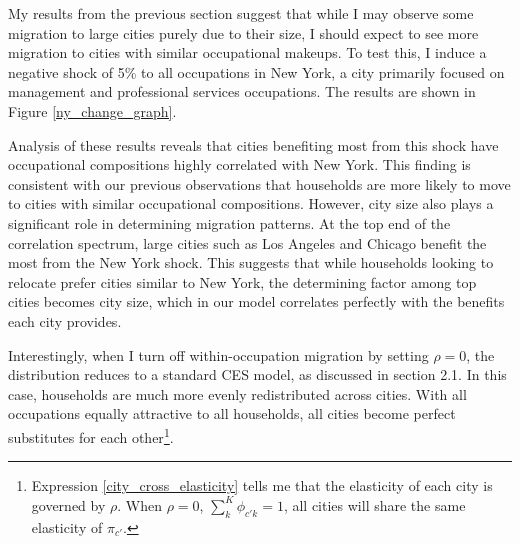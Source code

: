 \documentclass[10pt]{article}
\begin{document}
My results from the previous section suggest that while I may observe some migration to large cities purely due to their size, I should expect to see more migration to cities with similar occupational makeups. To test this, I induce a negative shock of 5\% to all occupations in New York, a city primarily focused on management and professional services occupations. The results are shown in Figure \ref{ny_change_graph}.

Analysis of these results reveals that cities benefiting most from this shock have occupational compositions highly correlated with New York. This finding is consistent with our previous observations that households are more likely to move to cities with similar occupational compositions. However, city size also plays a significant role in determining migration patterns. At the top end of the correlation spectrum, large cities such as Los Angeles and Chicago benefit the most from the New York shock. This suggests that while households looking to relocate prefer cities similar to New York, the determining factor among top cities becomes city size, which in our model correlates perfectly with the benefits each city provides.

Interestingly, when I turn off within-occupation migration by setting $\rho = 0$, the distribution reduces to a standard CES model, as discussed in section 2.1. In this case, households are much more evenly redistributed across cities. With all occupations equally attractive to all households, all cities become perfect substitutes for each other\footnote{Expression \ref{city_cross_elasticity} tells me that the elasticity of each city is governed by $\rho$. When $\rho = 0$, $\sum_{k}^{K} \phi_{c'k} = 1$, all cities will share the same elasticity of $\pi_{c'}.$}.
\end{document}
